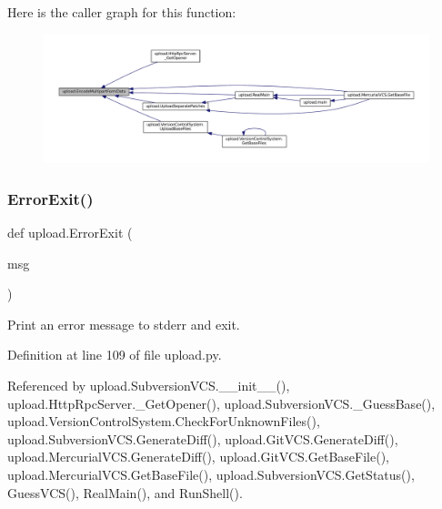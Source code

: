 Here is the caller graph for this function\+:
\nopagebreak
\begin{figure}[H]
\begin{center}
\leavevmode
\includegraphics[width=350pt]{namespaceupload_ae12985a2c860c124c502dd2099b702eb_icgraph}
\end{center}
\end{figure}
\mbox{\label{namespaceupload_adea53186a1d73e92cc839b7c35c2c044}} 
\subsubsection{\texorpdfstring{Error\+Exit()}{ErrorExit()}}
{\footnotesize\ttfamily def upload.\+Error\+Exit (\begin{DoxyParamCaption}\item[{}]{msg }\end{DoxyParamCaption})}

\begin{DoxyVerb}Print an error message to stderr and exit.\end{DoxyVerb}
 

Definition at line 109 of file upload.\+py.



Referenced by upload.\+Subversion\+V\+C\+S.\+\_\+\+\_\+init\+\_\+\+\_\+(), upload.\+Http\+Rpc\+Server.\+\_\+\+Get\+Opener(), upload.\+Subversion\+V\+C\+S.\+\_\+\+Guess\+Base(), upload.\+Version\+Control\+System.\+Check\+For\+Unknown\+Files(), upload.\+Subversion\+V\+C\+S.\+Generate\+Diff(), upload.\+Git\+V\+C\+S.\+Generate\+Diff(), upload.\+Mercurial\+V\+C\+S.\+Generate\+Diff(), upload.\+Git\+V\+C\+S.\+Get\+Base\+File(), upload.\+Mercurial\+V\+C\+S.\+Get\+Base\+File(), upload.\+Subversion\+V\+C\+S.\+Get\+Status(), Guess\+V\+C\+S(), Real\+Main(), and Run\+Shell().


